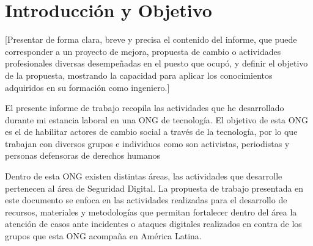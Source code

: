 \documentclass[12pt]{caltech_thesis}
\begin{document}
\chapter{Introducción y Objetivo}

[Presentar de forma clara, breve y precisa el contenido del informe, que puede corresponder a un proyecto de mejora, propuesta de cambio o actividades profesionales diversas desempeñadas en el puesto que ocupó, y definir el objetivo de la propuesta, mostrando la capacidad para aplicar los conocimientos adquiridos en su formación como ingeniero.]

El presente informe de trabajo recopila las actividades que he desarrollado durante mi estancia laboral en una ONG  de tecnología. El objetivo de esta ONG es el de habilitar actores de cambio social a través de la tecnología, por lo que trabajan con diversos grupos e individuos como son activistas, periodistas y personas defensoras de derechos humanos

Dentro de esta ONG existen distintas áreas, las actividades que desarrolle pertenecen al área de Seguridad Digital. La propuesta de trabajo presentada en este documento se enfoca en las actividades realizadas para el desarrollo de recursos, materiales y metodologías que permitan fortalecer dentro del área la atención de casos ante incidentes  o ataques digitales  realizados en contra de los grupos que esta ONG acompaña en América Latina.





\end{document}

